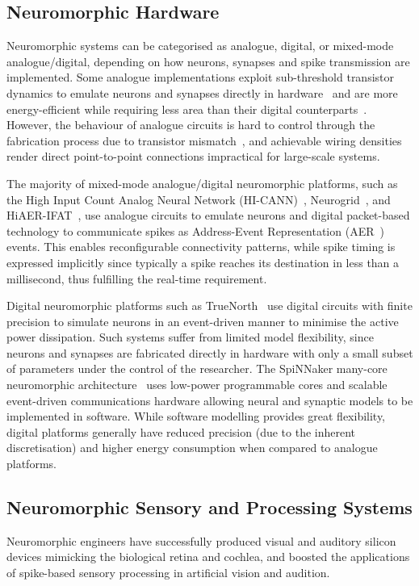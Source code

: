 \subsection{Neuromorphic Hardware}
\label{subsec:neuromorphic_hw}
Neuromorphic systems can be categorised as analogue, digital, or mixed-mode analogue/digital, depending on how neurons, synapses and spike transmission are implemented. 
Some analogue implementations exploit sub-threshold transistor dynamics to emulate neurons and synapses directly in hardware~\citep{indiveri2011neuromorphic} and are more energy-efficient while requiring less area than their digital counterparts~\citep{joubert2012hardware}.
However, the behaviour of analogue circuits is hard to control through the fabrication process due to transistor mismatch~\citep{indiveri2011neuromorphic,pedram2006thermal,linares2003compact}, and achievable \protect{} wiring densities render direct point-to-point connections impractical for large-scale systems.

The majority of mixed-mode analogue/digital neuromorphic platforms, such as the High Input Count Analog Neural Network (HI-CANN)~\citep{schemmel2010wafer}, Neurogrid~\citep{benjamin2014neurogrid}, and HiAER-IFAT~\citep{yu201265k}, use analogue circuits to emulate neurons and digital packet-based technology to communicate spikes as Address-Event Representation (AER~\citep{lazzaro1995multi}) events.
This enables reconfigurable connectivity patterns, while spike timing is expressed implicitly since typically a spike reaches its destination in less than a millisecond, thus fulfilling the real-time requirement.

Digital neuromorphic platforms such as TrueNorth~\citep{merolla2014million} use digital circuits with finite precision to simulate neurons in an event-driven manner to minimise the active power dissipation.
Such systems suffer from limited model flexibility, since neurons and synapses are fabricated directly in hardware with only a small subset of parameters under the control of the researcher.
The SpiNNaker many-core neuromorphic architecture~\citep{furber2014spinnaker} uses low-power programmable cores and scalable event-driven communications hardware allowing neural and synaptic models to be implemented in software.
While software modelling provides great flexibility, digital platforms generally have reduced precision (due to the inherent discretisation) and higher energy consumption when compared to analogue platforms.

\subsection{Neuromorphic Sensory and Processing Systems}
\label{sec:morph}
Neuromorphic engineers have successfully produced visual and auditory silicon devices mimicking the biological retina and cochlea, and boosted the applications of spike-based sensory processing in artificial vision and audition.

